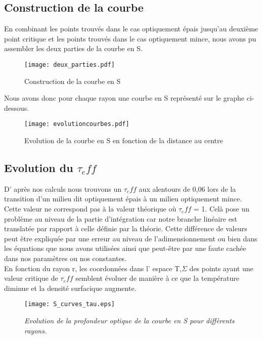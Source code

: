 \subsection{Construction de la courbe}

En combinant les points trouvés dans le cas optiquement épais jusqu'au deuxième point critique et les points trouvés dans le cas optiquement mince, nous avons pu assembler les deux parties de la courbe en S.

\begin{figure}[htb!]
	\centering
	\texttt{[image: deux\_parties.pdf]}
	\caption{Construction de la courbe en S}
	\label{Fig::bench}
\end{figure}


Nous avons donc pour chaque rayon une courbe en S représenté sur le graphe ci-dessous.
\begin{figure}[htb!]
	\centering
	\texttt{[image: evolutioncourbes.pdf]}
	\caption{Evolution de la courbe en S en fonction de la distance au centre}
	\label{Fig::bench}
\end{figure}



\subsection{Evolution du $\tau_eff$}

D' après nos calculs nous trouvons un $\tau_eff$ aux alentours de 0,06 lors de la transition d'un milieu dit optiquement épais à un milieu optiquement mince. Cette valeur ne correspond pas à la valeur théorique où $\tau_eff$ = 1. 
Celà pose un problème au niveau de la partie d'intégration car notre branche linéaire est translatée par rapport à celle définie par la théorie. 
Cette différence de valeurs peut être expliquée par une erreur au niveau de l’adimensionnement ou bien dans les équations que nous avons utilisées ainsi que peut-être par une faute cachée dans nos paramètres ou nos constantes. 
\\
En fonction du rayon r, les coordonnées dans l' espace {T,$\Sigma$} des points ayant une valeur critique de $\tau_eff$ semblent évoluer de manière à ce que la température diminue et la densité surfacique augmente.

\begin{figure}[htb!]
	\centering
	\texttt{[image: S\_curves\_tau.eps]}
	\caption{\textit{Evolution de la profondeur optique de la courbe en S pour diffèrents rayons.}  }
	\label{Fig::bench}
\end{figure}

